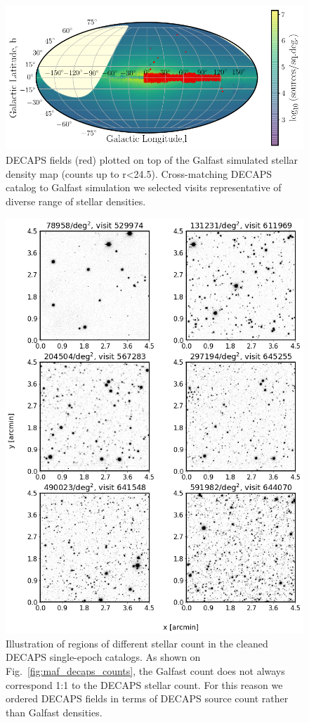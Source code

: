 \documentclass[DM,lsstdraft,toc,usenatbib,authoryear]{lsstdoc}
\begin{document}
\begin{figure}

\includegraphics[width=1.0\columnwidth]{figs/MAF_DECAPS.png}
\caption{DECAPS fields (red) plotted on top of the Galfast simulated stellar density map (counts up to r<24.5). Cross-matching DECAPS catalog to Galfast simulation we selected visits representative of diverse range of stellar densities.}
\label{fig:decaps_fields}
\end{figure}


\begin{figure}
\begin{centering}
\includegraphics[width=0.85\columnwidth]{figs/Illustrate_densities_DECAPS.png}
\vskip -0.15in
\caption{Illustration of regions of different stellar count in the cleaned DECAPS single-epoch catalogs. As shown on Fig.~\ref{fig:maf_decaps_counts}, the Galfast count does not always correspond 1:1 to the DECAPS stellar count. For this reason we ordered DECAPS fields in terms of DECAPS source count rather than Galfast densities.}
\label{fig:decaps_illustrate}
\end{centering}
\end{figure}
\end{document}
